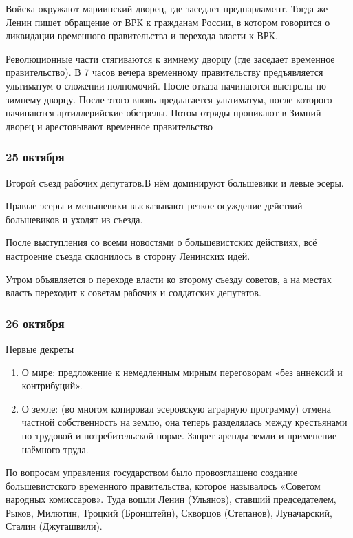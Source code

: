 Войска окружают мариинский дворец, где заседает предпарламент. Тогда же Ленин пишет обращение от ВРК к гражданам России, в котором говорится о ликвидации временного правительства и перехода власти к ВРК.

Революционные части стягиваются к зимнему дворцу (где заседает временное правительство). В 7 часов вечера временному правительству предъявляется ультиматум о сложении полномочий. После отказа начинаются выстрелы по зимнему дворцу. После этого вновь предлагается ультиматум, после которого начинаются артиллерийские обстрелы. Потом отряды проникают в Зимний дворец и арестовывают временное правительство

\subsubsection{\textbf{25 октября}}

Второй съезд рабочих депутатов.В нём доминируют большевики и левые эсеры.

Правые эсеры и меньшевики высказывают резкое осуждение действий большевиков и уходят из съезда.

После выступления со всеми новостями о большевистских действиях, всё настроение съезда склонилось в сторону Ленинских идей.

Утром объявляется о переходе власти ко второму съезду советов, а на местах власть переходит к советам рабочих и солдатских депутатов.

\subsubsection{\textbf{26 октября}}

Первые декреты

\begin{enumerate}
    \item О мире: предложение к немедленным мирным переговорам «без аннексий и контрибуций». 
    \item О земле: (во многом копировал эсеровскую аграрную программу) отмена частной собственность на землю, она теперь разделялась между крестьянами по трудовой и потребительской норме. Запрет аренды земли и применение наёмного труда.
\end{enumerate}

По вопросам управления государством было провозглашено создание большевистского временного правительства, которое называлось «Советом народных комиссаров». Туда вошли Ленин (Ульянов), ставший председателем, Рыков, Милютин, Троцкий (Бронштейн), Скворцов (Степанов), Луначарский, Сталин (Джугашвили).

